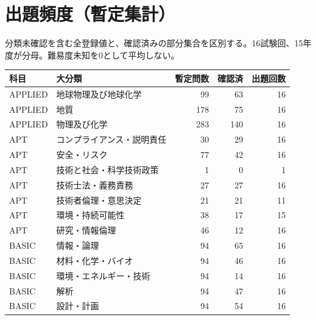 \chapter{出題頻度（暫定集計）}
分類未確認を含む全登録値と、確認済みの部分集合を区別する。16試験回、15年度が分母。難易度未知を0として平均しない。
\begin{longtable}{p{.16\linewidth}p{.42\linewidth}rrr}
科目 & 大分類 & 暫定問数 & 確認済 & 出題回数\\\hline
APPLIED & 地球物理及び地球化学 & 99 & 63 & 16\\
APPLIED & 地質 & 178 & 75 & 16\\
APPLIED & 物理及び化学 & 283 & 140 & 16\\
APT & コンプライアンス・説明責任 & 30 & 29 & 16\\
APT & 安全・リスク & 77 & 42 & 16\\
APT & 技術と社会・科学技術政策 & 1 & 0 & 1\\
APT & 技術士法・義務責務 & 27 & 27 & 16\\
APT & 技術者倫理・意思決定 & 21 & 21 & 11\\
APT & 環境・持続可能性 & 38 & 17 & 15\\
APT & 研究・情報倫理 & 46 & 12 & 16\\
BASIC & 情報・論理 & 94 & 65 & 16\\
BASIC & 材料・化学・バイオ & 94 & 46 & 16\\
BASIC & 環境・エネルギー・技術 & 94 & 14 & 16\\
BASIC & 解析 & 94 & 47 & 16\\
BASIC & 設計・計画 & 94 & 54 & 16\\
\end{longtable}

